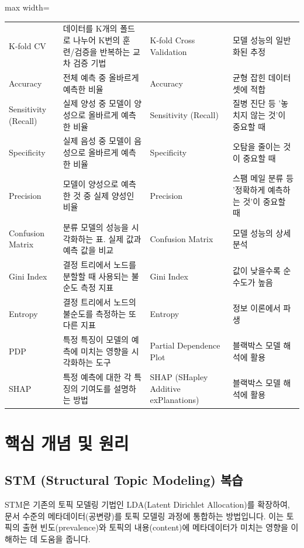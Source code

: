 \documentclass[11pt,a4paper]{article}
\begin{document}
\begin{adjustbox}{max width=\textwidth}
\begin{tabular}{llll}
K-fold CV & 데이터를 K개의 폴드로 나누어 K번의 훈련/검증을 반복하는 교차 검증 기법 & K-fold Cross Validation & 모델 성능의 일반화된 추정 \\
Accuracy & 전체 예측 중 올바르게 예측한 비율 & Accuracy & 균형 잡힌 데이터셋에 적합 \\
Sensitivity (Recall) & 실제 양성 중 모델이 양성으로 올바르게 예측한 비율 & Sensitivity (Recall) & 질병 진단 등 '놓치지 않는 것'이 중요할 때 \\
Specificity & 실제 음성 중 모델이 음성으로 올바르게 예측한 비율 & Specificity & 오탐을 줄이는 것이 중요할 때 \\
Precision & 모델이 양성으로 예측한 것 중 실제 양성인 비율 & Precision & 스팸 메일 분류 등 '정확하게 예측하는 것'이 중요할 때 \\
Confusion Matrix & 분류 모델의 성능을 시각화하는 표. 실제 값과 예측 값을 비교 & Confusion Matrix & 모델 성능의 상세 분석 \\
Gini Index & 결정 트리에서 노드를 분할할 때 사용되는 불순도 측정 지표 & Gini Index & 값이 낮을수록 순수도가 높음 \\
Entropy & 결정 트리에서 노드의 불순도를 측정하는 또 다른 지표 & Entropy & 정보 이론에서 파생 \\
PDP & 특정 특징이 모델의 예측에 미치는 영향을 시각화하는 도구 & Partial Dependence Plot & 블랙박스 모델 해석에 활용 \\
SHAP & 특정 예측에 대한 각 특징의 기여도를 설명하는 방법 & SHAP (SHapley Additive exPlanations) & 블랙박스 모델 해석에 활용 \\
\bottomrule
\end{tabular}
\end{adjustbox}

\newpage
\section*{핵심 개념 및 원리}

\subsection{STM (Structural Topic Modeling) 복습}

STM은 기존의 토픽 모델링 기법인 LDA(Latent Dirichlet Allocation)를 확장하여, 문서 수준의 메타데이터(공변량)를 토픽 모델링 과정에 통합하는 방법입니다. 이는 토픽의 출현 빈도(prevalence)와 토픽의 내용(content)에 메타데이터가 미치는 영향을 이해하는 데 도움을 줍니다.
\end{document}
